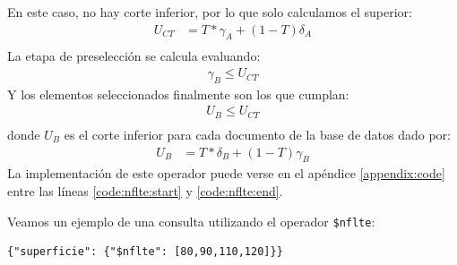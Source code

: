 En este caso, no hay corte inferior, por lo que solo calculamos el superior:
%
\begin{align*}
    U_{CT} &= T * \gamma_A + (1-T)\delta_A \\
\end{align*}
%
La etapa de preselección se calcula evaluando:
%
\begin{align*}
    \gamma_B \leq U_{CT}
\end{align*}
%
Y los elementos seleccionados finalmente son los que cumplan:
%
\begin{align*}
    U_B \leq U_{CT} \\
\end{align*}
%
donde $U_B$ es el corte inferior para cada documento de la base de datos dado por:
%
\begin{align*}
    U_B &= T * \delta_B + (1-T)\gamma_B
\end{align*}
%
La implementación de este operador puede verse en el apéndice \ref{appendix:code} entre las líneas \ref{code:nflte:start} y \ref{code:nflte:end}.

\begin{example}
Veamos un ejemplo de una consulta utilizando el operador \texttt{\$nflte}:
%
\begin{verbatim}
{"superficie": {"$nflte": [80,90,110,120]}}
\end{verbatim}

\end{example}
